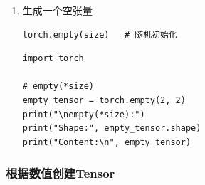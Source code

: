 \begin{enumerate}[label=\arabic*)]
\item 生成一个空张量
\begin{lstlisting}[style=demostyle,numbers=none]
torch.empty(size)   # 随机初始化
\end{lstlisting}
\begin{lstlisting}[style=pythonstyle]
import torch

# empty(*size)
empty_tensor = torch.empty(2, 2)
print("\nempty(*size):")
print("Shape:", empty_tensor.shape)
print("Content:\n", empty_tensor)
\end{lstlisting}
\end{enumerate}
    
\subsubsection{根据数值创建Tensor}                
\label{subsubsec:Pytorch根据数值创建Tensor}

